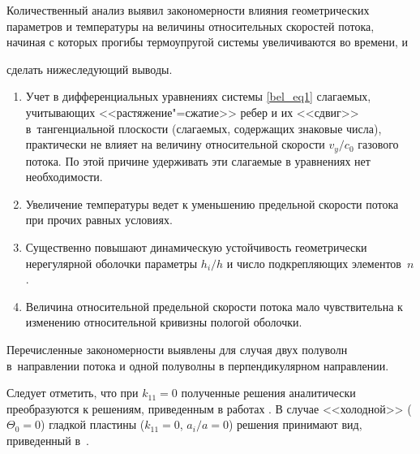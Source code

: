 Количественный анализ выявил закономерности влияния геометрических параметров  и температуры  на величины относительных скоростей потока,  начиная с которых прогибы термоупругой системы увеличиваются во времени, и 

сделать нижеследующий выводы.

 

\begin{enumerate}

	\item[1.] Учет в дифференциальных уравнениях системы \eqref{bel_eq1} слагаемых, учитывающих <<растяжение"=сжатие>> ребер и их <<сдвиг>> в~тангенциальной плоскости (слагаемых, содержащих знаковые числа), практически не влияет на величину относительной скорости ${v_y}/{c_0}$ газового потока. По этой причине удерживать эти слагаемые в уравнениях нет необходимости.

	\item[2.] Увеличение температуры ведет к уменьшению предельной скорости потока при прочих равных условиях.

	\item[3.] Существенно повышают динамическую устойчивость геометрически нерегулярной оболочки параметры ${h_i}/{h}$ и число подкрепляющих элементов~$n$. 

	\item[4.] Величина относительной предельной скорости потока мало чувствительна к изменению относительной кривизны пологой оболочки.

\end{enumerate} 





Перечисленные закономерности выявлены для случая двух полуволн в~направлении потока и одной полуволны в перпендикулярном направлении.  

Следует отметить, что при $k_{11}=0$ полученные решения аналитически преобразуются к решениям, приведенным в работах \cite{myl-bib:31, myl-bib:35}. В случае <<холодной>> ($\Theta_0=0$) гладкой пластины   ($k_{11}=0$, ${a_i}/{a}=0$) решения принимают вид, приведенный в~\cite{myl-bib:30}.









